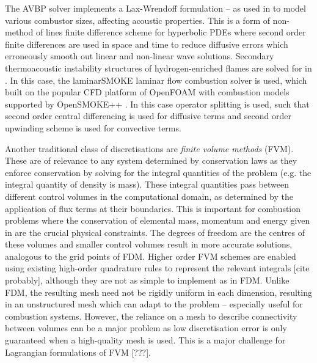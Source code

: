 The AVBP solver \cite{cerfacsAVBP, schonfeld1999SteadyUnsteadyFlow} implements a Lax-Wrendoff formulation \cite{lax1960SystemsConservationLaws} -- as used in \cite{garby2013LargeEddySimulationCombustion} to model various combustor sizes, affecting acoustic properties. This is a form of non-method of lines finite difference scheme for hyperbolic PDEs where second order finite differences are used in space and time to reduce diffusive errors which erroneously smooth out linear and non-linear wave solutions. Secondary thermoacoustic instability structures of hydrogen-enriched flames are solved for in \cite{jun2023ParametricInstabilityPropagating}. In this case, the laminarSMOKE \cite{cuoci2013LaminarSMOKE, cuoci2013NumericalModelingLaminar} laminar flow combustion solver is used, which built on the popular CFD platform of OpenFOAM \cite{opencfdltd2004OpenFOAM, jasak2007OpenFOAMLibraryComplex, jasak2009OpenFOAMOpenSource} with combustion models supported by OpenSMOKE++ \cite{cuoci2015OpenSMOKE, cuoci2015OpenSMOKEObjectorientedFramework}. In this case operator splitting is used, such that second order central differencing is used for diffusive terms and second order upwinding scheme is used for convective terms.

Another traditional class of discretisations are \emph{finite volume methods} (FVM). These are of relevance to any system determined by conservation laws as they enforce conservation by solving for the integral quantities of the problem (e.g. the integral quantity of density is mass). These integral quantities pass between different control volumes in the computational domain, as determined by the application of flux terms at their boundaries. This is important for combustion problems where the conservation of elemental mass, momentum and energy given in  are the crucial physical constraints. The degrees of freedom are the centres of these volumes and smaller control volumes result in more accurate solutions, analogous to the grid points of FDM. Higher order FVM schemes are enabled using existing high-order quadrature rules to represent the relevant integrals [cite probably], although they are not as simple to implement as in FDM. Unlike FDM, the resulting mesh need not be rigidly uniform in each dimension, resulting in an unstructured mesh which can adapt to the problem -- especially useful for combustion systems. However, the reliance on a mesh to describe connectivity between volumes can be a major problem as low discretisation error is only guaranteed when a high-quality mesh is used. This is a major challenge for Lagrangian formulations of FVM [???].

